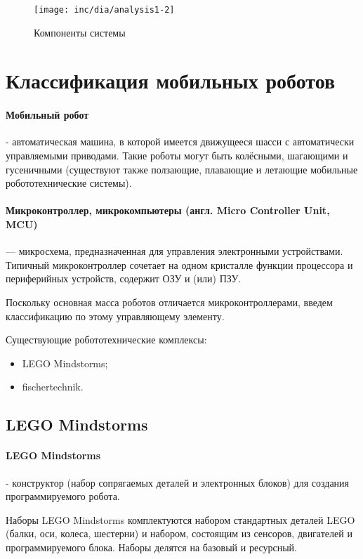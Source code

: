 \begin{figure}
  \centering
  \texttt{[image: inc/dia/analysis1-2]}
  \caption{Компоненты системы}
  \label{fig:fig02}
\end{figure}

\section{Классификация мобильных роботов}
\paragraph{Мобильный робот} - автоматическая машина, в которой имеется движущееся шасси с автоматически управляемыми приводами. Такие роботы могут быть колёсными, шагающими и гусеничными (существуют также ползающие, плавающие и летающие мобильные робототехнические системы).

\paragraph{Микроконтроллер, микрокомпьютеры (англ. Micro Controller Unit, MCU)} — микросхема, предназначенная для управления электронными устройствами. Типичный микроконтроллер сочетает на одном кристалле функции процессора и периферийных устройств, содержит ОЗУ и (или) ПЗУ. 

Поскольку основная масса роботов отличается микроконтроллерами, введем классификацию по этому управляющему элементу.

Существующие робототехнические комплексы:
\begin{itemize}
\item LEGO Mindstorms;
\item fischertechnik.
\end{itemize}

\subsection{LEGO Mindstorms}

\paragraph{LEGO Mindstorms} - конструктор (набор сопрягаемых деталей и электронных блоков) для создания программируемого робота. 

Наборы LEGO Mindstorms комплектуются набором стандартных деталей LEGO (балки, оси, колеса, шестерни) и набором, состоящим из сенсоров, двигателей и программируемого блока. Наборы делятся на базовый и ресурсный.

